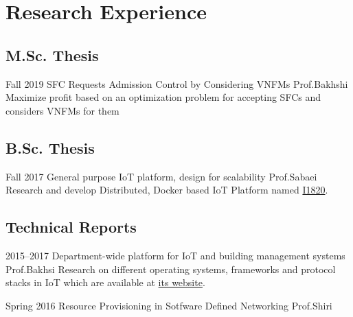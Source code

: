 \section{Research Experience}

\subsection{M.Sc. Thesis}

\cventry%
  {Fall 2019}
  {SFC Requests Admission Control by Considering VNFMs}
  {}
  {Prof.Bakhshi}
  {}
  {Maximize profit based on an optimization problem for accepting SFCs and considers VNFMs for them}

\subsection{B.Sc. Thesis}

\cventry%
  {Fall 2017}
  {General purpose IoT platform, design for scalability}
  {}
  {Prof.Sabaei}
  {}{%
    Research and develop Distributed, Docker based IoT Platform named \href{https://github.com/I1820}{I1820}.
  }

\subsection{Technical Reports}

\cventry%
  {2015--2017}
  {Department-wide platform for IoT and building management systems}
  {}
  {Prof.Bakhsi}
  {}{%
    Research on different operating systems, frameworks and protocol stacks in IoT which are available at \href{https://aolab.github.io/}{its website}.
  }

\cventry%
  {Spring 2016}
  {Resource Provisioning in Sotfware Defined Networking}
  {}
  {}
  {Prof.Shiri}
  {}

